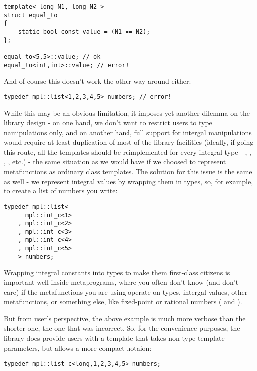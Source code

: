 \documentclass{netobjectdays}
\begin{document}
{\footnotesize
\begin{verbatim}
template< long N1, long N2 >
struct equal_to
{
    static bool const value = (N1 == N2);
};

equal_to<5,5>::value; // ok
equal_to<int,int>::value; // error!
\end{verbatim}
}

And of course this doesn't work the other way around either:

{\footnotesize
\begin{verbatim}
typedef mpl::list<1,2,3,4,5> numbers; // error!
\end{verbatim}
}

While this may be an obvious limitation, it imposes yet 
another dilemma on the library design - on one hand, we don't 
want to restrict users to type namipulations only, and on another 
hand, full support for intergal manipulations would require at 
least duplication of most of the library facilities (ideally, 
if going this route, all the templates should be reimplemented 
for every integral type - , , ,
, etc.) - the same situation as we would have if we 
choosed to represent metafunctions as ordinary class templates.
The solution for this issue is the same as well - we represent 
integral values by wrapping them in types, so, for example, to 
create a list of numbers you write:

{\footnotesize
\begin{verbatim}
typedef mpl::list<
      mpl::int_c<1>
    , mpl::int_c<2>
    , mpl::int_c<3>
    , mpl::int_c<4>
    , mpl::int_c<5>
    > numbers;
\end{verbatim}
}

Wrapping integral constants into types to make them 
first-class citizens is important well inside metaprograms, 
where you often don't know (and don't care) if the 
metafunctions you are using operate on types, intergal 
values, other metafunctions, or something else, like 
fixed-point or rational numbers ( 
and ).

But from user's perspective, the above example is much more
verbose than the shorter one, the one that was incorrect. So, 
for the convenience purposes, the library does provide users 
with a template that takes non-type template parameters, but 
allows a more compact notaion:

{\footnotesize
\begin{verbatim}
typedef mpl::list_c<long,1,2,3,4,5> numbers;
\end{verbatim}
}
\end{document}
